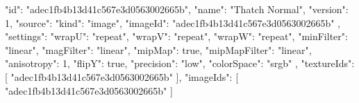 {
  "id": "adec1fb4b13d41c567e3d0563002665b",
  "name": "Thatch Normal",
  "version": 1,
  "source": {
    "kind": "image",
    "imageId": "adec1fb4b13d41c567e3d0563002665b"
  },
  "settings": {
    "wrapU": "repeat",
    "wrapV": "repeat",
    "wrapW": "repeat",
    "minFilter": "linear",
    "magFilter": "linear",
    "mipMap": true,
    "mipMapFilter": "linear",
    "anisotropy": 1,
    "flipY": true,
    "precision": "low",
    "colorSpace": "srgb"
  },
  "textureIds": [
    "adec1fb4b13d41c567e3d0563002665b"
  ],
  "imageIds": [
    "adec1fb4b13d41c567e3d0563002665b"
  ]
}
